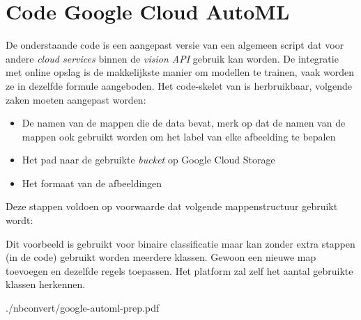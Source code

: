 
\chapter{Code Google Cloud AutoML}
\label{ch:app:google-automl}

De onderstaande code is een aangepast versie van een algemeen script dat voor andere \textit{cloud services} binnen de \textit{vision API} gebruik kan worden. De integratie met online opslag is de makkelijkste manier om modellen te trainen, vaak worden ze in dezelfde formule aangeboden. Het code-skelet van \textcite{Guo2018} is herbruikbaar, volgende zaken moeten aangepast worden:

\begin{itemize}
    \item De namen van de mappen die de data bevat, merk op dat de namen van de mappen ook gebruikt worden om het label van elke afbeelding te bepalen
    \item Het pad naar de gebruikte \textit{bucket} op Google Cloud Storage
    \item Het formaat van de afbeeldingen
\end{itemize}

Deze stappen voldoen op voorwaarde dat volgende mappenstructuur gebruikt wordt:


Dit voorbeeld is gebruikt voor binaire classificatie maar kan zonder extra stappen (in de code) gebruikt worden meerdere klassen. Gewoon een nieuwe map toevoegen en dezelfde regels toepassen. Het platform zal zelf het aantal gebruikte klassen herkennen.


{./nbconvert/google-automl-prep.pdf}
